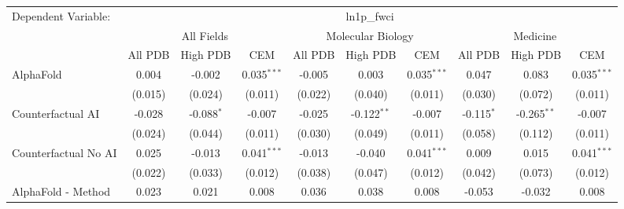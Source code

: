 \begingroup
\centering
\begin{tabular}{lccccccccc}
   \tabularnewline \midrule \midrule
   Dependent Variable: & \multicolumn{9}{c}{ln1p\_fwci}\\
 & \multicolumn{3}{c}{All Fields} & \multicolumn{3}{c}{Molecular Biology} & \multicolumn{3}{c}{Medicine} \\
\cmidrule(lr){2-7} \cmidrule(lr){5-10} \cmidrule(lr){8-7}
 & \multicolumn{1}{c}{All PDB} & \multicolumn{1}{c}{High PDB} & \multicolumn{1}{c}{CEM} & \multicolumn{1}{c}{All PDB} & \multicolumn{1}{c}{High PDB} & \multicolumn{1}{c}{CEM} & \multicolumn{1}{c}{All PDB} & \multicolumn{1}{c}{High PDB} & \multicolumn{1}{c}{CEM} \\
\cmidrule(lr){2-3} \cmidrule(lr){3-4} \cmidrule(lr){4-5} \cmidrule(lr){5-6} \cmidrule(lr){6-7} \cmidrule(lr){7-8} \cmidrule(lr){8-9} \cmidrule(lr){9-10} \cmidrule(lr){10-3}
   AlphaFold                                                   & 0.004          & -0.002         & 0.035$^{***}$ & -0.005         & 0.003          & 0.035$^{***}$ & 0.047         & 0.083         & 0.035$^{***}$\\   
                                                               & (0.015)        & (0.024)        & (0.011)       & (0.022)        & (0.040)        & (0.011)       & (0.030)       & (0.072)       & (0.011)\\   
   Counterfactual AI                                           & -0.028         & -0.088$^{*}$   & -0.007        & -0.025         & -0.122$^{**}$  & -0.007        & -0.115$^{*}$  & -0.265$^{**}$ & -0.007\\   
                                                               & (0.024)        & (0.044)        & (0.011)       & (0.030)        & (0.049)        & (0.011)       & (0.058)       & (0.112)       & (0.011)\\   
   Counterfactual No AI                                        & 0.025          & -0.013         & 0.041$^{***}$ & -0.013         & -0.040         & 0.041$^{***}$ & 0.009         & 0.015         & 0.041$^{***}$\\   
                                                               & (0.022)        & (0.033)        & (0.012)       & (0.038)        & (0.047)        & (0.012)       & (0.042)       & (0.073)       & (0.012)\\   
   AlphaFold - Method                                          & 0.023          & 0.021          & 0.008         & 0.036          & 0.038          & 0.008         & -0.053        & -0.032        & 0.008\\   

\end{tabular}
